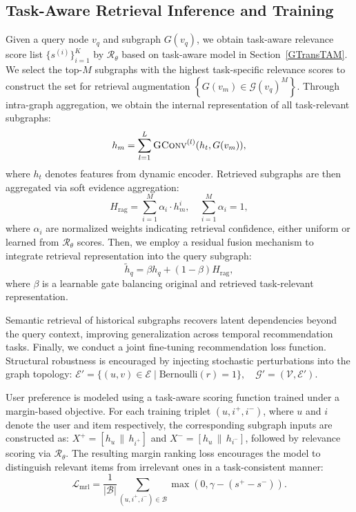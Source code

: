 \documentclass[letterpaper]{article} %
\begin{document}
\subsection{Task-Aware Retrieval Inference and Training}
Given a query node $v_q$ and subgraph $G(v_q)$, we obtain task-aware relevance score list $\{s^{(i)}\}_{i=1}^{K}$ by $\mathcal{R}_\theta$ based on task-aware model in Section~\ref{GTransTAM}. We select the top-$M$ subgraphs with the highest task-specific relevance scores to construct the set for retrieval augmentation $\left\{ {G}(v_m) \in \mathcal{G}(v_q)^M \right\}$. Through intra-graph aggregation, we obtain the internal representation of all task-relevant subgraphs: 
\begin{equation}
\label{eq:intra_agg}
h_m = \sum_{l=1}^{L} \textsc{GConv}^{(l)}(h_t, {G}(v_m)),
\end{equation}
where $h_t$ denotes features from dynamic encoder. Retrieved subgraphs are then aggregated via soft evidence aggregation:
\begin{equation}
\label{eq:soft_agg}
H_{\text{rag}} = \sum_{i=1}^{M} \alpha_i \cdot h_m^i, \quad \sum_{i=1}^{M} \alpha_i = 1,
\end{equation}
where $\alpha_i$ are normalized weights indicating retrieval confidence, either uniform or learned from $\mathcal{R}_\theta$ scores. Then, we employ a residual fusion mechanism to integrate retrieval representation into the query subgraph:
\begin{equation}
\label{eq:fuse_agg}
\tilde{h}_q = \beta h_q + (1 - \beta) H_{\text{rag}},
\end{equation}
where $\beta$ is a learnable gate balancing original and retrieved task-relevant representation.

Semantic retrieval of historical subgraphs recovers latent dependencies beyond the query 
context, improving generalization across temporal 
recommendation tasks. 
Finally, we conduct a joint fine-tuning recommendation loss function. Structural robustness is encouraged by injecting stochastic perturbations into the graph topology: $\mathcal{E}' = \{ (u, v) \in \mathcal{E} \mid \text{Bernoulli}(r) = 1 \}, \quad \mathcal{G}' = (\mathcal{V}, \mathcal{E}')$.

User preference is modeled using a task-aware scoring function trained under a margin-based objective. For each training triplet $(u, i^+, i^-)$, where $u$ and $i$ denote the user and item respectively, the corresponding subgraph inputs are constructed as: ${X}^+ = [{h}_u \, \| \, {h}_{i^+}]$ and ${X}^- = [{h}_u \, \| \, {h}_{i^-}]$, followed by relevance scoring via $\mathcal{R}_\theta$. The resulting margin ranking loss encourages the model to distinguish relevant items from irrelevant ones in a task-consistent manner:
\begin{equation}
\mathcal{L}_{\text{mrl}} = \frac{1}{|\mathcal{B}|} \sum_{(u, i^+, i^-) \in \mathcal{B}} \max(0, \gamma - (s^+ - s^-)).
\end{equation}
\end{document}
